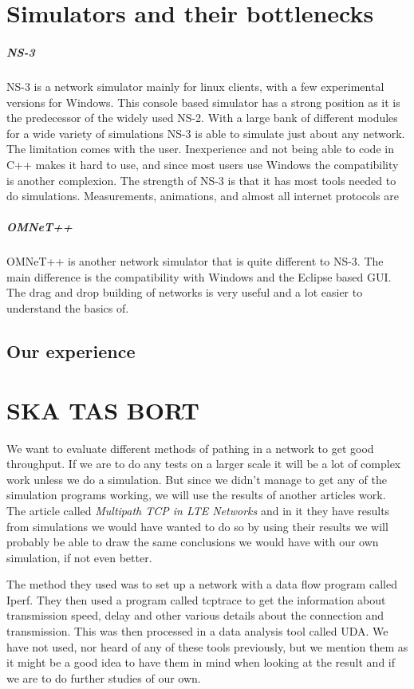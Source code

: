 \documentclass[11pt,twocolumn]{article}
\begin{document}
\section{Simulators and their bottlenecks}

\subparagraph{NS-3}

NS-3 is a network simulator mainly for linux clients, with a few experimental versions for Windows. This console based simulator has a strong position as it is the predecessor of the widely used NS-2. With a large bank of different modules for a wide variety of simulations NS-3 is able to simulate just about any network. The limitation comes with the user. Inexperience and not being able to code in C++ makes it hard to use, and since most users use Windows the compatibility is another complexion. The strength of NS-3 is that it has most tools needed to do simulations. Measurements, animations, and almost all internet protocols are  

\subparagraph{OMNeT++}

OMNeT++ is another network simulator that is quite different to NS-3. The main difference is the compatibility with Windows and the Eclipse based GUI. The drag and drop building of networks is very useful and a lot easier to understand the basics of.

\subsection{Our experience}



\section{SKA TAS BORT}

We want to evaluate different methods of pathing in a network to get good throughput. If we are to do any tests on a larger scale it will be a lot of complex work unless we do a simulation. But since we didn't manage to get any of the simulation programs working, we will use the results of another articles work. The article called \emph{Multipath TCP in LTE Networks} and in it they have results from simulations we would have wanted to do so by using their results we will probably be able to draw the same conclusions we would have with our own simulation, if not even better.

The method they used was to set up a network with a data flow program called Iperf. They then used a program called tcptrace to get the information about transmission speed, delay and other various details about the connection and transmission. This was then processed in a data analysis tool called UDA. We have not used, nor heard of any of these tools previously, but we mention them as it might be a good idea to have them in mind when looking at the result and if we are to do further studies of our own.
\end{document}
